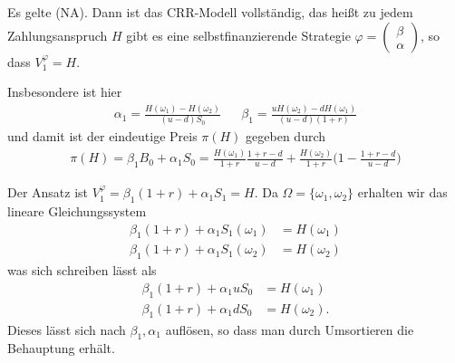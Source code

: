 \documentclass[a4paper,twoside,DIV15,BCOR12mm]{scrbook}
\begin{document}
\begin{lemma}\label{lem:2.4.2}
Es gelte (NA). Dann ist das CRR-Modell vollständig, das heißt zu jedem Zahlungsanspruch $H$ gibt es eine selbstfinanzierende Strategie $\varphi = 
\left(\begin{smallmatrix} \beta \\ \alpha \end{smallmatrix}\right)$,
so dass $V_1^\varphi = H$.

Insbesondere ist hier 
\begin{align*}
\alpha_1 = \frac{H(\omega_1) - H (\omega_2)}{(u-d)S_0} && 
\beta_1 = \frac{u H(\omega_2) - d H(\omega_1)}{(u-d)(1+r)}
\end{align*}
und damit ist der eindeutige Preis $\pi(H)$ gegeben durch
\begin{align*}
\pi(H) = \beta_1 B_0 + \alpha_1 S_0 = \frac{H(\omega_1)}{1+r} \frac{1+r-d}{u-d} + \frac{H(\omega_2)}{1+r} \bigg(1 - \frac{1+r-d}{u-d}\bigg)
\end{align*}
\end{lemma}

\begin{beweis}
Der Ansatz ist $V_1^\varphi = \beta_1(1+r) + \alpha_1 S_1 = H$. Da $\Omega=\{\omega_1,\omega_2\}$ erhalten wir das lineare Gleichungssystem
\begin{align*}
\beta_1(1+r) + \alpha_1 S_1(\omega_1) &= H (\omega_1) \\
\beta_1(1+r) + \alpha_1 S_1(\omega_2) &= H (\omega_2) 
\end{align*}
was sich schreiben lässt als
\begin{align*}
\beta_1(1+r) + \alpha_1 u S_0  &= H (\omega_1) \\
\beta_1(1+r) + \alpha_1 d S_0  &= H (\omega_2).
\end{align*}
Dieses lässt sich nach $\beta_1, \alpha_1$ auflösen, so dass man durch Umsortieren die Behauptung erhält.
\end{beweis}
\end{document}
